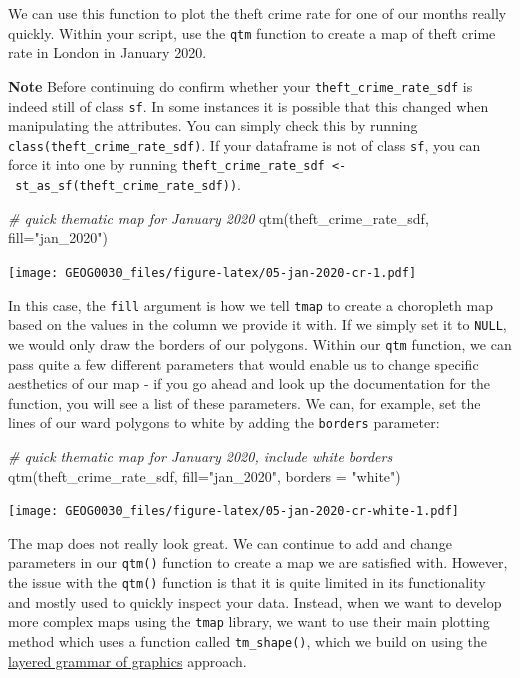 \documentclass[
]{book}
\newenvironment{Shaded}{\begin{snugshade}}{\end{snugshade}}
\newcommand{\AttributeTok}[1]{\textcolor[rgb]{0.77,0.63,0.00}{#1}}
\newcommand{\CommentTok}[1]{\textcolor[rgb]{0.56,0.35,0.01}{\textit{#1}}}
\newcommand{\FunctionTok}[1]{\textcolor[rgb]{0.00,0.00,0.00}{#1}}
\newcommand{\NormalTok}[1]{#1}
\newcommand{\StringTok}[1]{\textcolor[rgb]{0.31,0.60,0.02}{#1}}
\begin{document}
We can use this function to plot the theft crime rate for one of our months really quickly. Within your script, use the \texttt{qtm} function to create a map of theft crime rate in London in January 2020.

\textbf{Note}
Before continuing do confirm whether your \texttt{theft\_crime\_rate\_sdf} is indeed still of class \texttt{sf}. In some instances it is possible that this changed when manipulating the attributes. You can simply check this by running \texttt{class(theft\_crime\_rate\_sdf)}. If your dataframe is not of class \texttt{sf}, you can force it into one by running \texttt{theft\_crime\_rate\_sdf\ \textless{}-\ st\_as\_sf(theft\_crime\_rate\_sdf))}.

\begin{Shaded}
\begin{Highlighting}[]
\CommentTok{\# quick thematic map for January 2020}
\FunctionTok{qtm}\NormalTok{(theft\_crime\_rate\_sdf, }\AttributeTok{fill=}\StringTok{"jan\_2020"}\NormalTok{)}
\end{Highlighting}
\end{Shaded}

\texttt{[image: GEOG0030\_files/figure-latex/05-jan-2020-cr-1.pdf]}

In this case, the \texttt{fill} argument is how we tell \texttt{tmap} to create a choropleth map based on the values in the column we provide it with. If we simply set it to \texttt{NULL}, we would only draw the borders of our polygons. Within our \texttt{qtm} function, we can pass quite a few different parameters that would enable us to change specific aesthetics of our map - if you go ahead and look up the documentation for the function, you will see a list of these parameters. We can, for example, set the lines of our ward polygons to white by adding the \texttt{borders} parameter:

\begin{Shaded}
\begin{Highlighting}[]
\CommentTok{\# quick thematic map for January 2020, include white borders}
\FunctionTok{qtm}\NormalTok{(theft\_crime\_rate\_sdf, }\AttributeTok{fill=}\StringTok{"jan\_2020"}\NormalTok{, }\AttributeTok{borders =} \StringTok{"white"}\NormalTok{)}
\end{Highlighting}
\end{Shaded}

\texttt{[image: GEOG0030\_files/figure-latex/05-jan-2020-cr-white-1.pdf]}

The map does not really look great. We can continue to add and change parameters in our \texttt{qtm()} function to create a map we are satisfied with. However, the issue with the \texttt{qtm()} function is that it is quite limited in its functionality and mostly used to quickly inspect your data. Instead, when we want to develop more complex maps using the \texttt{tmap} library, we want to use their main plotting method which uses a function called \texttt{tm\_shape()}, which we build on using the \href{https://towardsdatascience.com/a-comprehensive-guide-to-the-grammar-of-graphics-for-effective-visualization-of-multi-dimensional-1f92b4ed4149}{layered grammar of graphics} approach.
\end{document}
